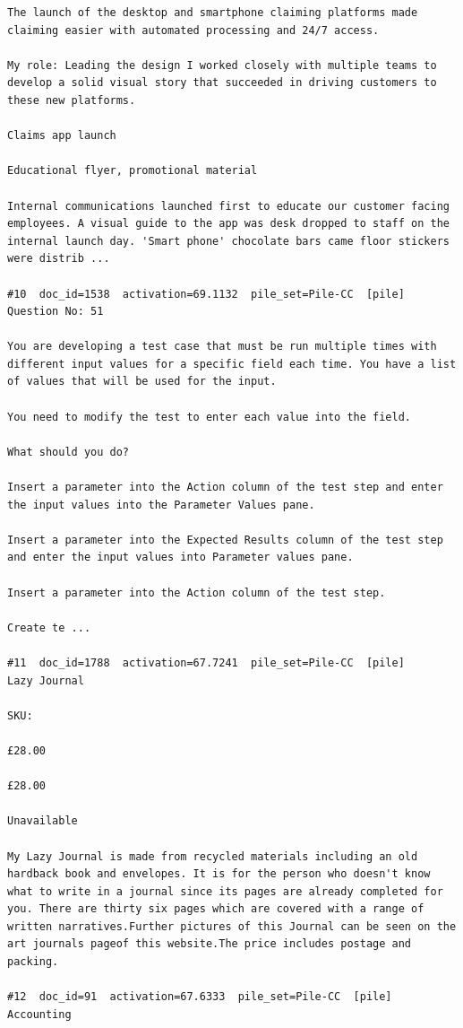 \begin{verbatim}
The launch of the desktop and smartphone claiming platforms made claiming easier with automated processing and 24/7 access.

My role: Leading the design I worked closely with multiple teams to develop a solid visual story that succeeded in driving customers to these new platforms.

Claims app launch

Educational flyer, promotional material

Internal communications launched first to educate our customer facing employees. A visual guide to the app was desk dropped to staff on the internal launch day. 'Smart phone' chocolate bars came floor stickers were distrib ...

#10  doc_id=1538  activation=69.1132  pile_set=Pile-CC  [pile]
Question No: 51

You are developing a test case that must be run multiple times with different input values for a specific field each time. You have a list of values that will be used for the input.

You need to modify the test to enter each value into the field.

What should you do?

Insert a parameter into the Action column of the test step and enter the input values into the Parameter Values pane.

Insert a parameter into the Expected Results column of the test step and enter the input values into Parameter values pane.

Insert a parameter into the Action column of the test step.

Create te ...

#11  doc_id=1788  activation=67.7241  pile_set=Pile-CC  [pile]
Lazy Journal

SKU:

£28.00

£28.00

Unavailable

My Lazy Journal is made from recycled materials including an old hardback book and envelopes. It is for the person who doesn't know what to write in a journal since its pages are already completed for you. There are thirty six pages which are covered with a range of written narratives.Further pictures of this Journal can be seen on the art journals pageof this website.The price includes postage and packing.

#12  doc_id=91  activation=67.6333  pile_set=Pile-CC  [pile]
Accounting


\end{verbatim}
